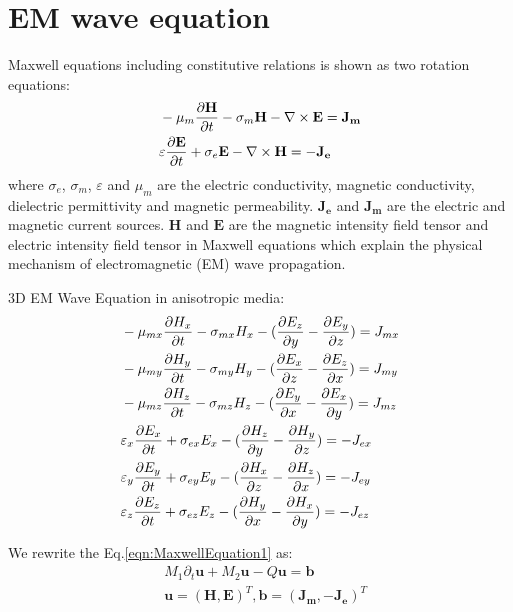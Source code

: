 \documentclass[pdftex,a4paper,parskip,listof=totoc,bibliography=totoc,onehalfspacing,12pt]{scrreprt}
\begin{document}
\section{EM wave equation}
\par Maxwell equations including constitutive relations is shown as two rotation equations: \\
\begin{equation}
\begin{aligned}
\label{eqn:MaxwellEquation}
&-\mu_{m} \pdv{ \mathbf{H}}{t} - \sigma_{m}\mathbf{H} - \nabla \times \mathbf{E} =  \mathbf{J_{m}} \\
&\varepsilon\pdv{ \mathbf{E}}{t} + \sigma_{e}\mathbf{E} -\nabla \times \mathbf{H} =  - \mathbf{J_{e}}
\end{aligned}
\end{equation}
where $\sigma_{e}$, $\sigma_{m}$, $\varepsilon$ and $\mu_{m}$ are the electric conductivity, magnetic conductivity, dielectric permittivity and magnetic permeability. $\mathbf{J_{e}}$ and $\mathbf{J_{m}}$ are the electric and magnetic current sources. $\mathbf{H}$ and $\mathbf{E}$ are the magnetic intensity field tensor and electric intensity field tensor in Maxwell equations which explain the physical mechanism of electromagnetic (EM) wave propagation.\\
\par 3D EM Wave Equation in anisotropic media:
\begin{equation}
\begin{aligned}
\label{eqn:MaxwellEquation1}
&-\mu_{mx} \pdv{H_{x}}{t} - \sigma_{mx} H_{x} - (\pdv{E_z}{y} - \pdv{E_y}{z}) = J_{mx}\\
&-\mu_{my} \pdv{H_{y}}{t} - \sigma_{my} H_{y} - (\pdv{E_x}{z} - \pdv{E_z}{x}) = J_{my}\\
&-\mu_{mz} \pdv{H_{z}}{t} - \sigma_{mz} H_{z} - (\pdv{E_y}{x} - \pdv{E_x}{y}) = J_{mz}\\
&\varepsilon_{x} \pdv{E_{x}}{t} + \sigma_{ex} E_{x} - (\pdv{H_z}{y} - \pdv{H_y}{z}) = -J_{ex}\\
&\varepsilon_{y} \pdv{E_{y}}{t} + \sigma_{ey} E_{y} - (\pdv{H_x}{z} - \pdv{H_z}{x}) = -J_{ey}\\
&\varepsilon_{z} \pdv{E_{z}}{t} + \sigma_{ez} E_{z} - (\pdv{H_y}{x} - \pdv{H_x}{y}) = -J_{ez}
\end{aligned}
\end{equation}
\par We rewrite the Eq.\ref{eqn:MaxwellEquation1} as:
\begin{equation}
\begin{aligned}
\label{eqn:MaxwellEquationMatrix}
&M_1 \partial_{t} \mathbf{u} + M_2 \mathbf{u} - Q\mathbf{u} = \mathbf{b} \\
&\mathbf{u} = (\mathbf{H}, \mathbf{E})^T, \mathbf{b} = (\mathbf{J_{m}}, -\mathbf{J_{e}})^T \\
\end{aligned}
\end{equation}
\end{document}
